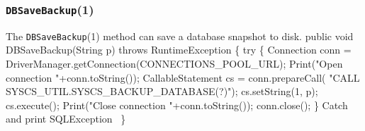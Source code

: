 \documentclass{article}
\def\nwendcode{\endtrivlist \endgroup}      %
\let\nwdocspar=\par
\theoremstyle{definition}                   %
\begin{document}
\subsubsection{{\tt{}\protect{}DBSaveBackup}(1)}
The {\tt{}\protect{}DBSaveBackup}(1) method can save a database snapshot to disk.
\nwenddocs{}\endmoddef{}
public void DBSaveBackup(String p) throws RuntimeException \{
  try \{
    Connection conn = DriverManager.getConnection(CONNECTIONS_POOL_URL);
    Print("Open connection "+conn.toString());
    CallableStatement cs = conn.prepareCall(
      "CALL SYSCS_UTIL.SYSCS_BACKUP_DATABASE(?)");
    cs.setString(1, p);
    cs.execute();
    Print("Close connection "+conn.toString());
    conn.close();
  \}
  \LA{}Catch and print \code{}SQLException\edoc{}~{\nwtagstyle{}}\RA{}
\}
\eatline
{}\nwendcode{}\nwdocspar
\end{document}
